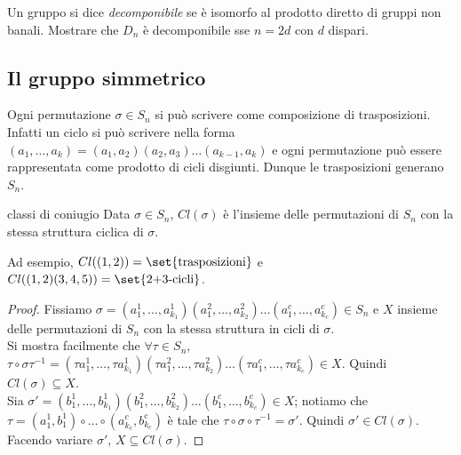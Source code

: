 \begin{exercise}
    Un gruppo si dice \emph{decomponibile} se è isomorfo al prodotto diretto di gruppi non banali. Mostrare che $D_n$ è decomponibile sse $n = 2d$ con $d$ dispari.
\end{exercise}

\subsection{Il gruppo simmetrico}

Ogni permutazione $\sigma \in S_n$ si può scrivere come composizione di trasposizioni. Infatti un ciclo si può scrivere nella forma $(a_1, \dots, a_k) = (a_1, a_2)(a_2,a_3)\dots(a_{k-1},a_k)$ e ogni permutazione può essere rappresentata come prodotto di cicli disgiunti. Dunque le trasposizioni generano $S_n$.

\begin{proposition}{classi di coniugio}
    Data $\sigma \in S_n$, $Cl(\sigma)$ è l'insieme delle permutazioni di $S_n$ con la stessa struttura ciclica di $\sigma$.
    
    Ad esempio, $Cl((1,2)) = \set{\text{trasposizioni}}$ e $Cl((1,2)(3,4,5)) = \set{\text{2+3-cicli}}$.
\end{proposition}
\begin{proof}
    Fissiamo $\sigma = (a^1_1, \dots, a^1_{k_1})(a^2_1, \dots, a^2_{k_2}) \dots (a^c_1, \dots, a^c_{k_c})\in S_n$ e $X$ insieme delle permutazioni di $S_n$ con la stessa struttura in cicli di $\sigma$. \\
    Si mostra facilmente che $\forall \tau \in S_n$, $\tau\circ\sigma\tau^{-1} = (\tau{a^1_1}, \dots, \tau{a^1_{k_1}})(\tau{a^2_1}, \dots, \tau{a^2_{k_2}}) \dots (\tau{a^c_1}, \dots, \tau{a^c_{k_c}}) \in X$. Quindi $Cl(\sigma)\subseteq X$. \\
    Sia $\sigma ' = (b^1_1, \dots, b^1_{k_1})(b^2_1, \dots, b^2_{k_2}) \dots (b^c_1, \dots, b^c_{k_c}) \in X$; notiamo che $\tau = (a^1_1,b^1_1)\circ\dots \circ (a^c_{k_c},b^c_{k_c})$ è tale che $\tau\circ \sigma\circ \tau^{-1} = \sigma'$. Quindi $\sigma' \in Cl(\sigma)$. Facendo variare $\sigma'$, $X \subseteq Cl(\sigma)$. 
\end{proof}

